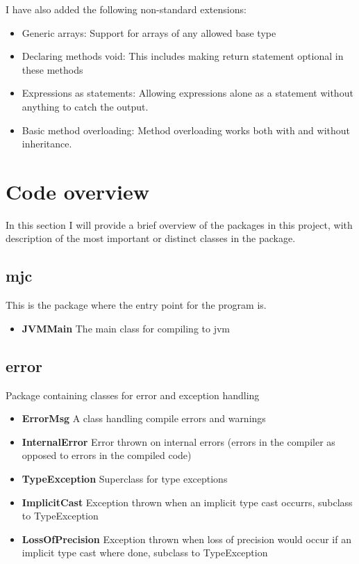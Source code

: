 \documentclass[a4paper,11pt]{article}
\begin{document}
  I have also added the following non-standard extensions:

  \begin{itemize}
     \item Generic arrays: Support for arrays of any allowed base type
     \item Declaring methods void: This includes making return statement optional in these methods
     \item Expressions as statements: Allowing expressions alone as a statement without anything to catch the output.
     \item Basic method overloading: Method overloading works both with and without inheritance.
  \end{itemize}

  \section{Code overview}
  In this section I will provide a brief overview of the packages in this project, with description of the most important or distinct classes in the package.
  \subsection{mjc}
     This is the package where the entry point for the program is.
     \begin{itemize}
        \item \textbf{JVMMain} The main class for compiling to jvm
     \end{itemize}

  \subsection{error}
     Package containing classes for error and exception handling
     \begin{itemize}
        \item \textbf{ErrorMsg} A class handling compile errors and warnings
        \item \textbf{InternalError} Error thrown on internal errors (errors in the compiler as opposed to errors in the compiled code)
        \item \textbf{TypeException} Superclass for type exceptions
        \item \textbf{ImplicitCast} Exception thrown when an implicit type cast occurrs, subclass to TypeException
        \item \textbf{LossOfPrecision} Exception thrown when loss of precision would occur if an implicit type cast where done, subclass to TypeException
     \end{itemize}
\end{document}
